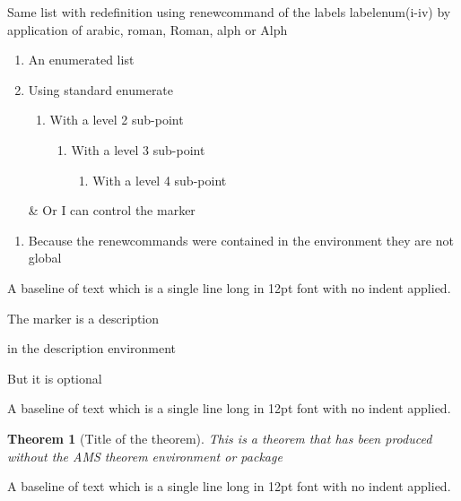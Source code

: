 \documentclass[12pt,a4paper]{article}
\newtheorem{theorem}{Theorem}[section] %
\begin{document}
Same list with redefinition using renewcommand of the labels labelenum(i-iv) by application of arabic, roman, Roman, alph or Alph
\begin{enumerate}
\renewcommand{\labelenumi}{\Roman{enumi}.}
\renewcommand{\labelenumii}{\roman{enumii}.}
\renewcommand{\labelenumiii}{\Alph{enumiii}.}
\renewcommand{\labelenumiv}{\alph{enumiv}.}
\item An enumerated list
\item Using standard enumerate
\begin{enumerate}
\item With a level 2 sub-point
\begin{enumerate}
\item With a level 3 sub-point
\begin{enumerate}
\item With a level 4 sub-point
\end{enumerate}
\end{enumerate}
\end{enumerate}
\item[\&] Or I can control the marker
\end{enumerate}

\begin{enumerate}
\item Because the renewcommands were contained in the environment they are not global
\end{enumerate}

\noindent
A baseline of text which is a single line long in 12pt font with no indent applied.

\begin{description}
\item[first] The marker is a description
\item[second] in the description environment
\item But it is optional
\end{description}


\noindent
A baseline of text which is a single line long in 12pt font with no indent applied.

\begin{theorem}[Title of the theorem]
This is a theorem that has been produced without the AMS theorem environment or package
\end{theorem}

\noindent
A baseline of text which is a single line long in 12pt font with no indent applied.
\end{document}
